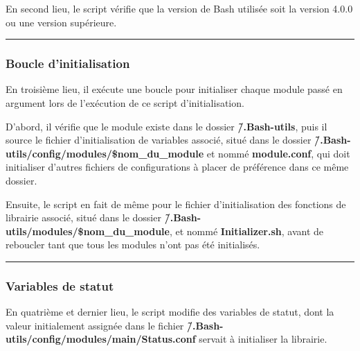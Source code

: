 \documentclass[a4paper,10pt]{article}
\begin{document}
\begin{justify}
    En second lieu, le script vérifie que la version de Bash utilisée soit la version 4.0.0 ou une version supérieure.
\end{justify}




\color{blue}\par\noindent\rule{\textwidth}{0.4pt}\color{white}

\color{blue}
\subsubsection{Boucle d'initialisation}\color{white}

\begin{justify}
    En troisième lieu, il exécute une boucle pour initialiser chaque module passé en argument lors de l'exécution de ce script d'initialisation.
\end{justify}

\begin{justify}
    D'abord, il vérifie que le module existe dans le dossier \textbf{\color{lime}\~/.Bash-utils}, puis il source le fichier d'initialisation de variables associé, situé dans le dossier \textbf{\color{lime}\~/.Bash-utils/config/modules/\$nom\_du\_module} et nommé \textbf{\color{lime}module.conf}, qui doit initialiser d'autres fichiers de configurations à placer de préférence dans ce même dossier.
\end{justify}

\begin{justify}
    Ensuite, le script en fait de même pour le fichier d'initialisation des fonctions de librairie associé, situé dans le dossier \textbf{\color{lime}\~/.Bash-utils/modules/\$nom\_du\_module}, et nommé \textbf{\color{lime}Initializer.sh}, avant de reboucler tant que tous les modules n'ont pas été initialisés.
\end{justify}



\color{blue}\par\noindent\rule{\textwidth}{0.4pt}\color{white}

\color{blue}
\subsubsection{Variables de statut}\color{white}

\begin{justify}
    En quatrième et dernier lieu, le script modifie des variables de statut, dont la valeur initialement assignée dans le fichier \textbf{\color{lime}\~/.Bash-utils/config/modules/main/Status.conf} servait à initialiser la librairie.
\end{justify}
\end{document}
